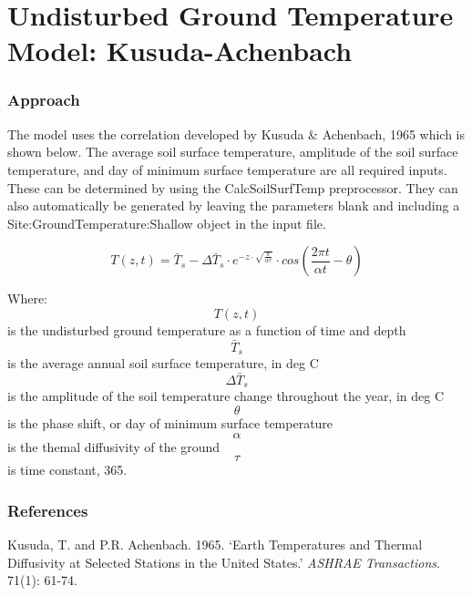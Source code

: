 \section{Undisturbed Ground Temperature Model: Kusuda-Achenbach}\label{undisturbed-ground-temperature-model-kusuda-achenbach}

\subsubsection{Approach}\label{approach-004}

The model uses the correlation developed by Kusuda \& Achenbach, 1965 which is shown below. The average soil surface temperature, amplitude of the soil surface temperature, and day of minimum surface temperature are all required inputs. These can be determined by using the CalcSoilSurfTemp preprocessor. They can also automatically be generated by leaving the parameters blank and including a Site:GroundTemperature:Shallow object in the input file.

\begin{equation}
T(z,t) = \bar{T}_{s} - \Delta\bar{T}_{s} \cdot e^{-z \cdot \sqrt{\frac{\pi}{\alpha\tau}}} \cdot cos\left( \frac{2\pi t}{\alpha t} - \theta \right)
\end{equation}

Where: \[T(z,t)\] is the undisturbed ground temperature as a function of time and depth \[\bar{T}_{s}\] is the average annual soil surface temperature, in deg C \[\Delta\bar{T}_{s}\] is the amplitude of the soil temperature change throughout the year, in deg C \[\theta\] is the phase shift, or day of minimum surface temperature \[\alpha\] is the themal diffusivity of the ground \[\tau\] is time constant, 365.

\subsubsection{References}\label{references-049}

Kusuda, T. and P.R. Achenbach. 1965. `Earth Temperatures and Thermal Diffusivity at Selected Stations in the United States.' \emph{ASHRAE Transactions}. 71(1): 61-74.
